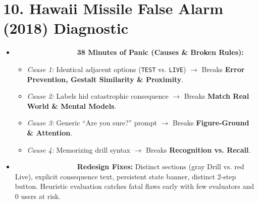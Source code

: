 \documentclass[8.5pt,a4paper,twocolumn]{article}
\newcommand{\tagund}{\colorbox{themeblue}{\textcolor{white}{\bfseries\fontsize{5.5pt}{6.5pt}\selectfont UNDERSTAND}}\ }
\begin{document}
\section*{10. Hawaii Missile False Alarm (2018) Diagnostic}
\begin{itemize}[leftmargin=7pt, itemsep=1pt, topsep=0.5pt]
    \item \tagund \textbf{38 Minutes of Panic (Causes \& Broken Rules):}
    \begin{itemize}[leftmargin=6pt, itemsep=0.5pt]
        \item \textit{Cause 1:} Identical adjacent options (\texttt{TEST} vs. \texttt{LIVE}) $\rightarrow$ Breaks \textbf{Error Prevention, Gestalt Similarity \& Proximity}.
        \item \textit{Cause 2:} Labels hid catastrophic consequence $\rightarrow$ Breaks \textbf{Match Real World \& Mental Models}.
        \item \textit{Cause 3:} Generic ``Are you sure?'' prompt $\rightarrow$ Breaks \textbf{Figure-Ground \& Attention}.
        \item \textit{Cause 4:} Memorizing drill syntax $\rightarrow$ Breaks \textbf{Recognition vs. Recall}.
    \end{itemize}
    \item \tagund \textbf{Redesign Fixes:} Distinct sections (gray Drill vs. red Live), explicit consequence text, persistent state banner, distinct 2-step button. Heuristic evaluation catches fatal flaws early with few evaluators and 0 users at risk.
\end{itemize}
\end{document}
